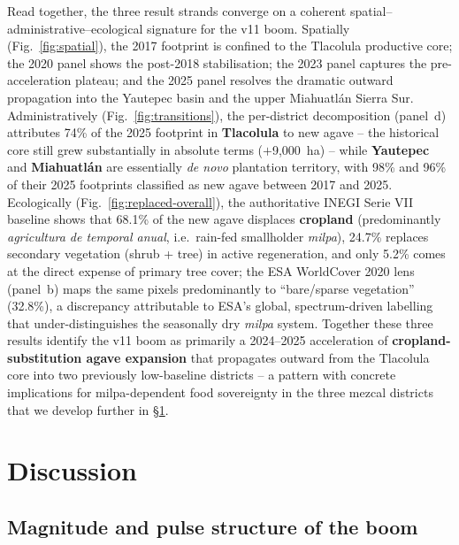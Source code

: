 \documentclass[10pt,a4paper]{article}
\begin{document}
Read together, the three result strands converge on a coherent
spatial--administrative--ecological signature for the v11 boom.
Spatially (Fig.~\ref{fig:spatial}), the 2017 footprint is confined
to the Tlacolula productive core; the 2020 panel shows the
post-2018 stabilisation; the 2023 panel captures the pre-acceleration
plateau; and the 2025 panel resolves the dramatic outward propagation
into the Yautepec basin and the upper Miahuatlán Sierra Sur.
Administratively (Fig.~\ref{fig:transitions}), the per-district
decomposition (panel~d) attributes 74\% of the 2025 footprint in
\textbf{Tlacolula} to new agave -- the historical core still grew
substantially in absolute terms ($+$9{,}000~ha) -- while
\textbf{Yautepec} and \textbf{Miahuatlán} are essentially
\emph{de novo} plantation territory, with 98\% and 96\% of their
2025 footprints classified as new agave between 2017 and 2025.
Ecologically (Fig.~\ref{fig:replaced-overall}), the
authoritative INEGI Serie VII baseline shows that 68.1\% of the
new agave displaces \textbf{cropland} (predominantly
\textit{agricultura de temporal anual}, i.e.\ rain-fed
smallholder \textit{milpa}), 24.7\% replaces secondary vegetation
(shrub + tree) in active regeneration, and only 5.2\% comes at
the direct expense of primary tree cover; the ESA WorldCover
2020 lens (panel~b) maps the same pixels predominantly to
``bare/sparse vegetation'' (32.8\%), a discrepancy attributable
to ESA's global, spectrum-driven labelling that under-distinguishes
the seasonally dry \textit{milpa} system. Together these three
results identify the v11 boom as primarily a 2024--2025
acceleration of \textbf{cropland-substitution agave expansion}
that propagates outward from the Tlacolula core into two
previously low-baseline districts -- a pattern with concrete
implications for milpa-dependent food sovereignty in the three
mezcal districts that we develop further in
\S\ref{sec:discussion}.

\section{Discussion}\label{sec:discussion}

\subsection{Magnitude and pulse structure of the boom}
\end{document}

